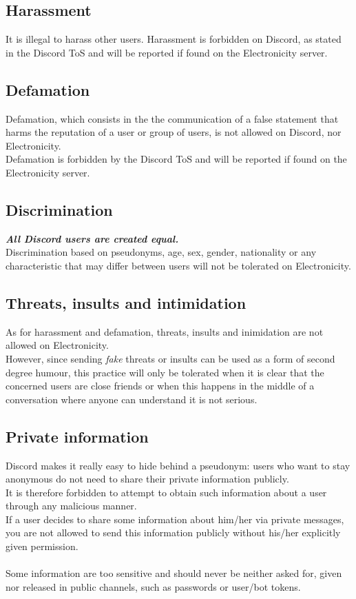 \documentclass[a4paper]{article}
\begin{document}
\subsection{Harassment}
It is illegal to harass other users. Harassment is forbidden on Discord, as stated in the Discord ToS and will be reported if found on the Electronicity server.

\subsection{Defamation}
Defamation, which consists in the the communication of a false statement that harms the reputation of a user or group of users, is not allowed on Discord, nor Electronicity.\\
Defamation is forbidden by the Discord ToS and will be reported if found on the Electronicity server.

\subsection{Discrimination}
\textbf{\textsl{All Discord users are created equal.}}\\
Discrimination based on pseudonyms, age, sex, gender, nationality or any characteristic that may differ between users will not be tolerated on Electronicity.

\subsection{Threats, insults and intimidation}
As for harassment and defamation, threats, insults and inimidation are not allowed on Electronicity.\\
However, since sending \textsl{fake} threats or insults can be used as a form of second degree humour, this practice will only be tolerated when it is clear that the concerned users are close friends or when this happens in the middle of a conversation where anyone can understand it is not serious.

\subsection{Private information}
Discord makes it really easy to hide behind a pseudonym: users who want to stay anonymous do not need to share their private information publicly.\\
It is therefore forbidden to attempt to obtain such information about a user through any malicious manner.\\
If a user decides to share some information about him/her via private messages, you are not allowed to send this information publicly without his/her explicitly given permission.\\
\\
Some information are too sensitive and should never be neither asked for, given nor released in public channels, such as passwords or user/bot tokens.
\end{document}
